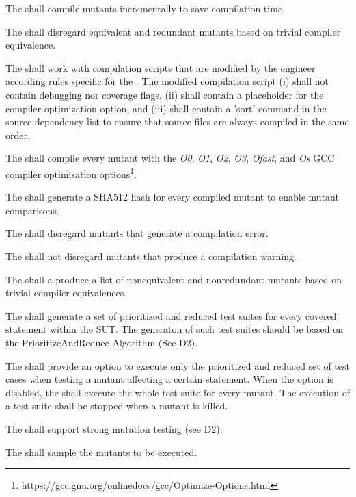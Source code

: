 \RQ{} The \FAQAS shall compile mutants incrementally to save compilation time.

\RQ{} The \FAQAS shall disregard equivalent and redundant mutants based on trivial compiler equivalence.

\RQ{} The \FAQAS shall work with compilation scripts that are modified by the engineer according rules specific for the \FAQAS. 
The modified compilation script (i) shall not contain debugging nor coverage flags, (ii) shall contain a placeholder for the compiler optimization option, and (iii) shall contain a 'sort' command in the source dependency list to ensure that source files are always compiled in the same order.

\RQ{} The \FAQAS shall compile every mutant with the \textit{O0}, \textit{O1}, \textit{O2}, \textit{O3}, \textit{Ofast}, and \textit{Os} GCC compiler optimisation options\footnote{https://gcc.gnu.org/onlinedocs/gcc/Optimize-Options.html}.

\RQ{} The \FAQAS shall generate a SHA512 hash for every compiled mutant to enable mutant comparisons. 

\RQ{} The \FAQAS shall disregard mutants that generate a compilation error.

\RQ{} The \FAQAS shall not disregard mutants that produce a compilation warning.

\RQ{} The \FAQAS shall a produce a list of nonequivalent and nonredundant mutants based on trivial compiler equivalences. 

\RQ{} The \FAQAS shall generate a set of prioritized and reduced test suites for every covered statement within the SUT.
The generaton of such test suites should be  based on the PrioritizeAndReduce Algorithm (See D2).

\RQ{} The \FAQAS shall provide an option to execute only the prioritized and reduced set of test cases when testing a mutant affecting a certain statement. When the option is disabled, the \FAQAS shall execute the whole test suite for every mutant. The execution of a test suite shall be stopped when a mutant is killed.


\RQ{} The \FAQAS shall support strong mutation testing (see D2).

\RQ{} The \FAQAS shall sample the mutants to be executed.

